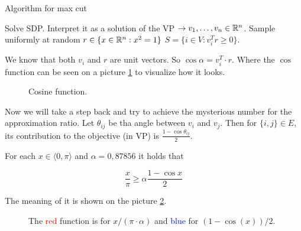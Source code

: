 \begin{algorithm}
	\caption{Algorithm for max cut}
	\begin{algorithmic}[1]
		\State Solve SDP.
		\State Interpret it as a solution of the VP $\to v_{1}, \dots, v_{n} \in \mathbb{R}^n$.
		\State Sample uniformly at random $r \in \{x \in \mathbb{R}^n : x^2 = 1\}$
		\State \Return $S = \{i \in V : v_{i}^T r \geq 0\}$.
	\end{algorithmic}
\end{algorithm}

We know that both $v_{i}$ and $r$ are unit vectors. So $\cos \alpha = v_{i}^T \cdot r$. Where the $\cos$ function can be seen on a picture \ref{cos} to visualize how it looks.

\begin{figure}[!ht]\centering
	\caption{Cosine function.}
	\label{cos}
\end{figure}

Now we will take a step back and try to achieve the mysterious number for the approximation ratio. Let $\theta_{ij}$ be tha angle between $v_{i}$ and $v_{j}$. Then for $\{i,j\} \in E$, its contribution to the objective (in VP) is $\frac{1 - \cos \theta_{ij}}{2}$.

\begin{lemma}[no proof]
	For each $x \in \langle 0, \pi \rangle$ and $\alpha = 0,87856$ it holds that
	
	$$
	\frac{x}{\pi} \geq \alpha \frac{1 - \cos x}{2}
	$$
\end{lemma}

The meaning of it is shown on the picture \ref{meaning}.

\begin{figure}[!ht]\centering
	\caption{The \textcolor{red}{red} function is for $x/(\pi \cdot \alpha)$ and \textcolor{blue}{blue} for $(1 - \cos(x)) /2$.}
	\label{meaning}
\end{figure}

